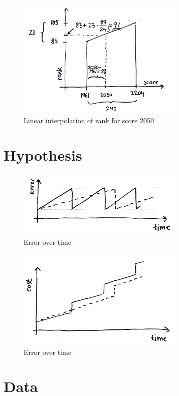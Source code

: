\begin{figure}[h!]
  \centering
  \caption{Linear interpolation of rank for score 2050}
  \label{fig:interpolation}
  \includegraphics[width=8cm]{img/interpolation.jpg}
\end{figure}

\section{Hypothesis} 

\begin{figure}[h]
  \centering
  \caption{Error over time}
  \label{fig:errortime}
  \includegraphics[width=8cm]{img/hypothesis2.jpg}
\end{figure}

\begin{figure}[h]
  \centering
  \caption{Error over time}
  \label{fig:errortime}
  \includegraphics[width=8cm]{img/hypothesis.jpg}
\end{figure}



\section{Data}

